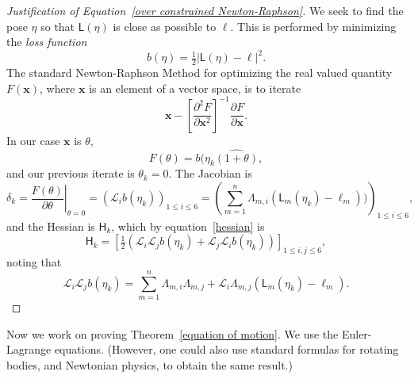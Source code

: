 \documentclass[reqno,12pt]{amsart}
\newcommand{\liederiv}{\mathcal L}
\begin{document}
\begin{proof}[Justification of Equation~\eqref{over constrained Newton-Raphson}]
We seek to find the pose $\eta$ so that $\mathsf L(\eta)$ is close as possible to $\bm\ell$.  This is performed by minimizing the \emph{loss function}
\begin{equation}
b(\eta) = \tfrac12 {|\mathsf L(\eta) - \bm\ell|}^2 .
\end{equation}
The standard Newton-Raphson Method for optimizing the real valued quantity $F(\bm x)$, where $\bm x$ is an element of a vector space, is to iterate
\begin{equation}
\bm x - \left[\frac{\partial^2 F}{\partial \bm x^2}\right]^{-1} \frac{\partial F}{\partial \bm x} .
\end{equation}
In our case $\bm x$ is $\theta$,
\begin{equation}
F(\theta) = b(\eta_k\widehat{(1+\theta)},
\end{equation}
and our previous iterate is $\theta_k = 0$.  The Jacobian is
\begin{equation}
\label{jacobian}
\delta_k = \left.\frac{F(\theta)}{\partial\theta} \right|_{\theta = 0} = (\liederiv_i b(\eta_k))_{1 \le i \le 6}
= \left(\sum_{m=1}^n \mathsf \Lambda_{m,i} (\mathsf L_m(\eta_k) - \ell_m))\right)_{1 \le i \le 6},
\end{equation}
and the Hessian is $\mathsf H_k$, which by equation~\eqref{hessian} is
\begin{equation}
\mathsf H_k
= \left[\tfrac12 (\liederiv_i \liederiv_j b(\eta_k) + \liederiv_j \liederiv_i b(\eta_k)) \right]_{1\le i,j\le 6},
\end{equation}
noting that
\begin{equation}
\liederiv_i \liederiv_j b(\eta_k) = \sum_{m=1}^n \mathsf\Lambda_{m,i} \mathsf\Lambda_{m,j} + \mathcal L_i \mathsf \Lambda_{m,j} (\mathsf L_m(\eta_k) - \ell_m) .
\end{equation}
\end{proof}


\bigskip

Now we work on proving Theorem~\ref{equation of motion}.  We use the Euler-Lagrange equations.  (However, one could also use standard formulas for rotating bodies, and Newtonian physics, to obtain the same result.)
\end{document}
